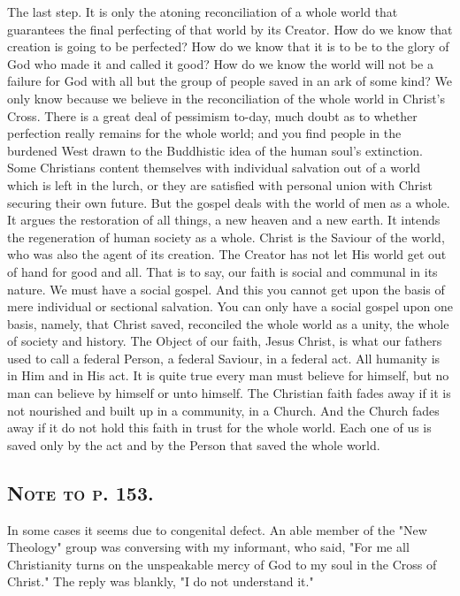 \documentclass[draft]{ptfdoc}
\begin{document}
The last step. It is only the atoning reconciliation 
of a whole world that guarantees the 
final perfecting of that world by its Creator. 
How do we know that creation is going to 
be perfected? How do we know that it is 
to be to the glory of God who made it and 
called it good? How do we know the world 
will not be a failure for God with all but the 
group of people saved in an ark of some kind? 
We only know because we believe in the 
reconciliation of the whole world in Christ's 
Cross. There is a great deal of pessimism 
to-day, much doubt as to whether perfection 
really remains for the whole world; and you 
find people in the burdened West drawn to 
the Buddhistic idea of the human soul's extinction. 
Some Christians content themselves 
with individual salvation out of a world which 
is left in the lurch, or they are satisfied with 
personal union with Christ securing their 
own future. But the gospel deals with the 
world of men as a whole. It argues the restoration 
of all things, a new heaven and a 
new earth. It intends the regeneration of 
human society as a whole. Christ is the 
Saviour of the world, who was also the agent 
of its creation. The Creator has not let His 
world get out of hand for good and all. That 
is to say, our faith is social and communal in 
its nature. We must have a social gospel. And 
this you cannot get upon the basis of mere 
individual or sectional salvation. You can only 
have a social gospel upon one basis, namely, that 
Christ saved, reconciled the whole world as a 
unity, the whole of society and history. The 
Object of our faith, Jesus Christ, is what our 
fathers used to call a federal Person, a federal 
Saviour, in a federal act. All humanity is in 
Him and in His act. It is quite true every 
man must believe for himself, but no man 
can believe by himself or unto himself. The 
Christian faith fades away if it is not nourished 
and built up in a community, in a Church. 
And the Church fades away if it do not hold 
this faith in trust for the whole world. Each 
one of us is saved only by the act and by the 
Person that saved the whole world. 

\subsection*{
\textsc{Note to p. 153.} 
}

In some cases it seems due to congenital defect. An 
able member of the "New Theology" group was conversing 
with my informant, who said, "For me all 
Christianity turns on the unspeakable mercy of God to my 
soul in the Cross of Christ." The reply was blankly, "I 
do not understand it." 
\end{document}
